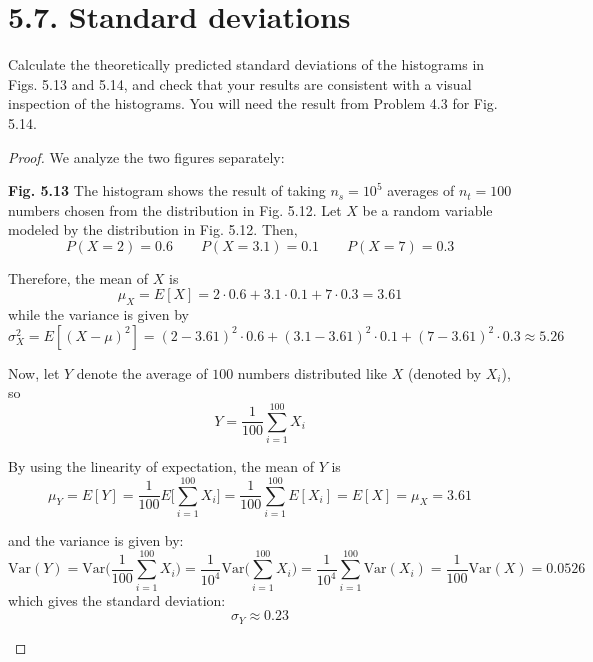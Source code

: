 \section*{5.7. Standard deviations}
Calculate the theoretically predicted standard deviations of the histograms in
Figs. 5.13 and 5.14, and check that your results are consistent with a visual
inspection of the histograms. You will need the result from Problem 4.3 for
Fig. 5.14.

\vspace{1em}

\begin{proof}
    We analyze the two figures separately:

    \vspace{1em}

    \textbf{Fig. 5.13} The histogram shows the result of taking $n_s = 10^5$ averages of
    $n_t = 100$ numbers chosen from the distribution in Fig. 5.12. Let $X$ be a
    random variable modeled by the distribution in Fig. 5.12. Then,
    \[
        P(X = 2) = 0.6 \hspace{2em} P(X = 3.1) = 0.1 \hspace{2em} P(X = 7) = 0.3
    \] 

    Therefore, the mean of $X$ is 
     \[
         \mu_X = E[X] = 2 \cdot 0.6 + 3.1 \cdot 0.1 + 7 \cdot 0.3 = 3.61
    \] 
    while the variance is given by
    \[
        \sigma_X^2 = E[(X - \mu)^2] = (2 - 3.61)^2 \cdot 0.6 + (3.1 - 3.61)^2 \cdot 0.1 + (7 - 3.61)^2 \cdot 0.3 
        \approx 5.26
    \] 

    Now, let $Y$ denote the average of $100$ numbers distributed like $X$ (denoted by $X_i$), so
    \[
        Y = \frac{1}{100}\sum_{i = 1}^{100} X_i
    \] 

    By using the linearity of expectation, the mean of $Y$ is
    \[
        \mu_Y = E[Y] = \frac{1}{100}E\bigg[\sum_{i = 1}^{100} X_i\bigg] 
        = \frac{1}{100}\sum_{i = 1}^{100} E[X_i] 
        = E[X] = \mu_X = 3.61
    \] 

    and the variance is given by:
    \[
        \text{Var}(Y) = \text{Var}\bigg(\frac{1}{100} \sum_{i = 1}^{100} X_i\bigg)
        = \frac{1}{10^4} \text{Var}\bigg(\sum_{i = 1}^{100} X_i\bigg)
        = \frac{1}{10^4} \sum_{i = 1}^{100} \text{Var}(X_i)
        = \frac{1}{100} \text{Var}(X) = 0.0526
    \]
    which gives the standard deviation:
    \[
        \sigma_Y \approx 0.23
    \] 

    \begin{figure}[H]%
        \centering
        \qquad
    \end{figure}


\end{proof}
